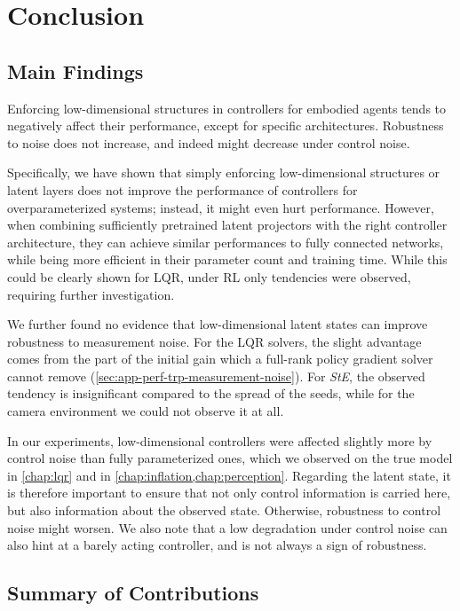 \chapter{Conclusion}
\label{chap:conclusion}

\section{Main Findings}
\label{sec:conclusions}

Enforcing low-dimensional structures in controllers for embodied agents tends to negatively affect 
their performance, except for specific architectures. Robustness to noise does not increase,
and indeed might decrease under control noise.

Specifically, we have shown that simply enforcing low-dimensional structures or latent layers does not
improve the performance of controllers for overparameterized systems; instead, it might even hurt performance. However,
when combining sufficiently pretrained latent projectors with the right controller architecture, they can
achieve similar performances to fully connected networks, while being more efficient in their parameter count
and training time. While this could be clearly shown for LQR, under RL only tendencies were observed, requiring
further investigation.

We further found no evidence that low-dimensional latent states can improve robustness to measurement noise.
For the LQR solvers, the slight advantage comes from the part of the initial gain which a full-rank
policy gradient solver cannot remove (\cref{sec:app-perf-trp-measurement-noise}). For \emph{StE}, the observed
tendency is insignificant compared to the spread of the seeds, while for the camera environment we could not observe
it at all.

In our experiments, low-dimensional controllers were affected slightly more by control noise than fully parameterized ones,
which we observed on the true model in \cref{chap:lqr} and in \cref{chap:inflation,chap:perception}. Regarding the latent state,
it is therefore important to ensure that not only control information is carried here, but also information about the observed state.
Otherwise, robustness to control noise might worsen. We also note that a low degradation under control noise can also hint at a barely acting
controller, and is not always a sign of robustness.

\section{Summary of Contributions}
\label{sec:contributions}


